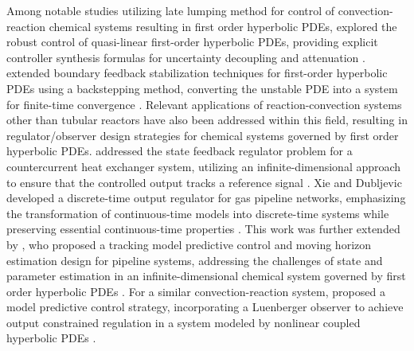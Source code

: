 Among notable studies utilizing late lumping method for control of convection-reaction chemical systems resulting in first order hyperbolic PDEs,  explored the robust control of quasi-linear first-order hyperbolic PDEs, providing explicit controller synthesis formulas for uncertainty decoupling and attenuation \autocite{christofides1998robust}.  extended boundary feedback stabilization techniques for first-order hyperbolic PDEs using a backstepping method, converting the unstable PDE into a system for finite-time convergence \autocite{krstic2008backstepping}. Relevant applications of reaction-convection systems other than tubular reactors have also been addressed within this field, resulting in regulator/observer design strategies for chemical systems governed by first order hyperbolic PDEs.  addressed the state feedback regulator problem for a countercurrent heat exchanger system, utilizing an infinite-dimensional approach to ensure that the controlled output tracks a reference signal \autocite{xu2016state}. Xie and Dubljevic  developed a discrete-time output regulator for gas pipeline networks, emphasizing the transformation of continuous-time models into discrete-time systems while preserving essential continuous-time properties \autocite{xie2021discrete}. This work was further extended by , who proposed a tracking model predictive control and moving horizon estimation design for pipeline systems, addressing the challenges of state and parameter estimation in an infinite-dimensional chemical system governed by first order hyperbolic PDEs \autocite{zhang2023tracking}. For a similar convection-reaction system,  proposed a model predictive control strategy, incorporating a Luenberger observer to achieve output constrained regulation in a system modeled by nonlinear coupled hyperbolic PDEs \autocite{zhang2022dynamic}.

